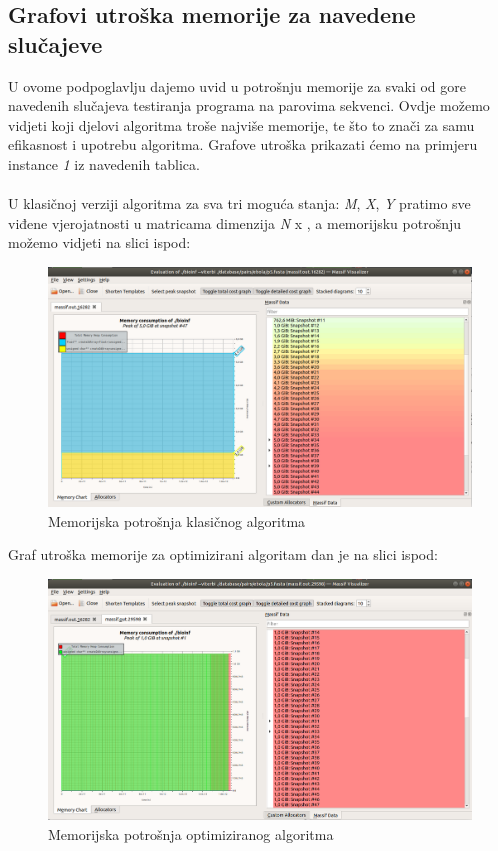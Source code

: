 \documentclass[a4paper]{article}
\begin{document}
\subsection{Grafovi utroška memorije za navedene slučajeve}
U ovome podpoglavlju dajemo uvid u potrošnju memorije za svaki od gore navedenih slučajeva testiranja programa na parovima sekvenci. Ovdje možemo vidjeti koji djelovi algoritma troše najviše memorije, te što to znači za samu efikasnost i upotrebu algoritma. Grafove utroška prikazati ćemo na primjeru instance \textit{1} iz navedenih tablica.\\\\
U klasičnoj verziji algoritma za sva tri moguća stanja: \textit{M}, \textit{X}, \textit{Y} pratimo sve viđene vjerojatnosti u matricama dimenzija \textit{N} x , a memorijsku potrošnju možemo vidjeti na slici ispod:
\begin{figure}[H]
\centering
\includegraphics[width=\linewidth]{memory-consumption-classic.png}
\caption{Memorijska potrošnja klasičnog algoritma}
\end{figure}

Graf utroška memorije za optimizirani algoritam dan je na slici ispod:
\begin{figure}[H]
\centering
\includegraphics[width=\linewidth]{memory-consumption-optimized.png}
\caption{Memorijska potrošnja optimiziranog algoritma}
\end{figure}
\end{document}

